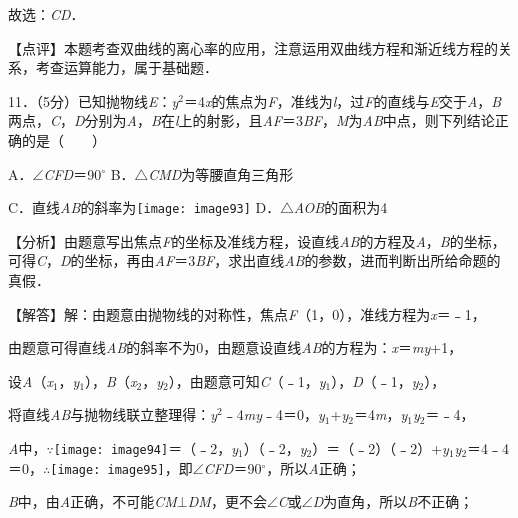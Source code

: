 \documentclass[a4paper,11pt,UTF8,twoside]{ctexart} %
\begin{document}
故选：\textit{CD}．

【点评】本题考查双曲线的离心率的应用，注意运用双曲线方程和渐近线方程的关系，考查运算能力，属于基础题．

11．（5分）已知抛物线\textit{E}：\textit{y}${}^{2}$＝4\textit{x}的焦点为\textit{F}，准线为\textit{l}，过\textit{F}的直线与\textit{E}交于\textit{A}，\textit{B}两点，\textit{C}，\textit{D}分别为\textit{A}，\textit{B}在\textit{l}上的射影，且{\textbar}\textit{AF}{\textbar}＝3{\textbar}\textit{BF}{\textbar}，\textit{M}为\textit{AB}中点，则下列结论正确的是（　　）

A．$\mathrm{\angle}$\textit{CFD}＝90$\mathrm{{}^\circ}$ B．$\mathrm{\triangle}$\textit{CMD}为等腰直角三角形 

C．直线\textit{AB}的斜率为\texttt{[image: image93]} D．$\mathrm{\triangle}$\textit{AOB}的面积为4

【分析】由题意写出焦点\textit{F}的坐标及准线方程，设直线\textit{AB}的方程及\textit{A}，\textit{B}的坐标，可得\textit{C}，\textit{D}的坐标，再由{\textbar}\textit{AF}{\textbar}＝3{\textbar}\textit{BF}{\textbar}，求出直线\textit{AB}的参数，进而判断出所给命题的真假．

【解答】解：由题意由抛物线的对称性，焦点\textit{F}（1，0），准线方程为\textit{x}＝﹣1，

由题意可得直线\textit{AB}的斜率不为0，由题意设直线\textit{AB}的方程为：\textit{x}＝\textit{my}+1，

设\textit{A}（\textit{x}${}_{1}$，\textit{y}${}_{1}$），\textit{B}（\textit{x}${}_{2}$，\textit{y}${}_{2}$），由题意可知\textit{C}（﹣1，\textit{y}${}_{1}$），\textit{D}（﹣1，\textit{y}${}_{2}$），

将直线\textit{AB}与抛物线联立整理得：\textit{y}${}^{2}$﹣4\textit{my}﹣4＝0，\textit{y}${}_{1}$+\textit{y}${}_{2}$＝4\textit{m}，\textit{y}${}_{1}$\textit{y}${}_{2}$＝﹣4，

\textit{A}中，$\mathrm{\because}$\texttt{[image: image94]}＝（﹣2，\textit{y}${}_{1}$）（﹣2，\textit{y}${}_{2}$）＝（﹣2）（﹣2）+\textit{y}${}_{1}$\textit{y}${}_{2}$＝4﹣4＝0，$\mathrm{\therefore}$\texttt{[image: image95]}，即$\mathrm{\angle}$\textit{CFD}＝90$\mathrm{{}^\circ}$，所以\textit{A}正确；

\textit{B}中，由\textit{A}正确，不可能\textit{CM}$\mathrm{\bot}$\textit{DM}，更不会$\mathrm{\angle}$\textit{C}或$\mathrm{\angle}$\textit{D}为直角，所以\textit{B}不正确；
\end{document}
